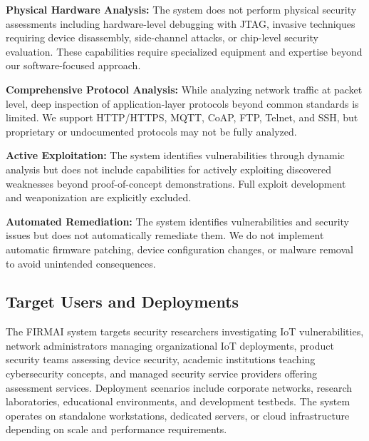 \textbf{Physical Hardware Analysis:} The system does not perform physical security assessments including hardware-level debugging with JTAG, invasive techniques requiring device disassembly, side-channel attacks, or chip-level security evaluation. These capabilities require specialized equipment and expertise beyond our software-focused approach.

\textbf{Comprehensive Protocol Analysis:} While analyzing network traffic at packet level, deep inspection of application-layer protocols beyond common standards is limited. We support HTTP/HTTPS, MQTT, CoAP, FTP, Telnet, and SSH, but proprietary or undocumented protocols may not be fully analyzed.

\textbf{Active Exploitation:} The system identifies vulnerabilities through dynamic analysis but does not include capabilities for actively exploiting discovered weaknesses beyond proof-of-concept demonstrations. Full exploit development and weaponization are explicitly excluded.

\textbf{Automated Remediation:} The system identifies vulnerabilities and security issues but does not automatically remediate them. We do not implement automatic firmware patching, device configuration changes, or malware removal to avoid unintended consequences.

\subsection{Target Users and Deployments}

The FIRMAI system targets security researchers investigating IoT vulnerabilities, network administrators managing organizational IoT deployments, product security teams assessing device security, academic institutions teaching cybersecurity concepts, and managed security service providers offering assessment services. Deployment scenarios include corporate networks, research laboratories, educational environments, and development testbeds. The system operates on standalone workstations, dedicated servers, or cloud infrastructure depending on scale and performance requirements.